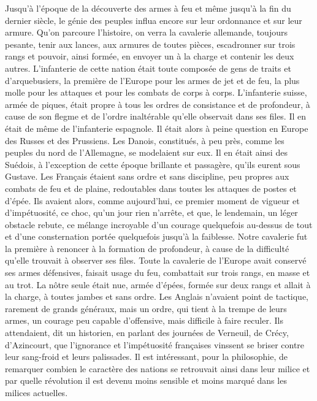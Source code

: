\documentclass[french,twoside]{book} %
\begin{document}
Jusqu’à l’époque de la découverte des armes à feu et même jusqu’à la fin du dernier siècle, le génie des peuples influa encore sur leur ordonnance et sur leur armure. Qu’on parcoure l’histoire, on verra la cavalerie allemande, toujours pesante, tenir aux lances, aux armures de toutes pièces, escadronner sur trois rangs et pouvoir, ainsi formée, en envoyer un à la charge et contenir les deux autres. L’infanterie de cette nation était toute composée de gens de traits et d’arquebusiers, la première de l’Europe pour les armes de jet et de feu, la plus molle pour les attaques et pour les combats de corps à corps. L’infanterie suisse, armée de piques, était propre à tous les ordres de consistance et de profondeur, à cause de son flegme et de l’ordre inaltérable qu’elle observait dans ses files. Il en était de même de l’infanterie espagnole. Il était alors à peine question en Europe des Russes et des Prussiens. Les Danois, constitués, à peu près, comme les peuples du nord de l’Allemagne, se modelaient sur eux. Il en était ainsi des Suédois, à l’exception de cette époque brillante et passagère, qu’ils eurent sous Gustave. Les Français étaient sans ordre et sans discipline, peu propres aux combats de feu et de plaine, redoutables dans toutes les attaques de postes et d’épée. Ils avaient alors, comme aujourd’hui, ce premier moment de vigueur et d’impétuosité, ce choc, qu’un jour rien n’arrête, et que, le lendemain, un léger obstacle rebute, ce mélange incroyable d’un courage quelquefois au-dessus de tout et d’une consternation portée quelquefois jusqu’à la faiblesse. Notre cavalerie fut la première à renoncer à la formation de profondeur, à cause de la difficulté qu’elle trouvait à observer ses files. Toute la cavalerie de l’Europe avait conservé ses armes défensives, faisait usage du feu, combattait sur trois rangs, en masse et au trot. La nôtre seule était nue, armée d’épées, formée sur deux rangs et allait à la charge, à toutes jambes et sans ordre. Les Anglais n’avaient point de tactique, rarement de grands généraux, mais un ordre, qui tient à la trempe de leurs armes, un courage peu capable d’offensive, mais difficile à faire reculer. Ils attendaient, dit un historien, en parlant des journées de Verneuil, de Crécy, d’Azincourt, que l’ignorance et l’impétuosité françaises vinssent se briser contre leur sang-froid et leurs palissades. Il est intéressant, pour la philosophie, de remarquer combien le caractère des nations se retrouvait ainsi dans leur milice et par quelle révolution il est devenu moins sensible et moins marqué dans les milices actuelles.\par
\end{document}
